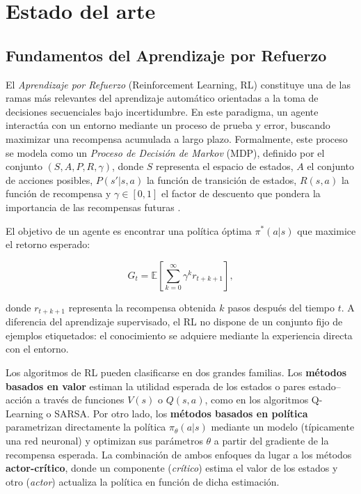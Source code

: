 \chapter{Estado del arte}

\section{Fundamentos del Aprendizaje por Refuerzo}

El \textit{Aprendizaje por Refuerzo} (Reinforcement Learning, RL) constituye una de las ramas más relevantes del aprendizaje automático orientadas a la toma de decisiones secuenciales bajo incertidumbre. En este paradigma, un agente interactúa con un entorno mediante un proceso de prueba y error, buscando maximizar una recompensa acumulada a largo plazo. Formalmente, este proceso se modela como un \textit{Proceso de Decisión de Markov} (MDP), definido por el conjunto $(S, A, P, R, \gamma)$, donde $S$ representa el espacio de estados, $A$ el conjunto de acciones posibles, $P(s'|s,a)$ la función de transición de estados, $R(s,a)$ la función de recompensa y $\gamma \in [0,1]$ el factor de descuento que pondera la importancia de las recompensas futuras \citep{SuttonBarto2018}.

El objetivo de un agente es encontrar una política óptima $\pi^*(a|s)$ que maximice el retorno esperado:

\begin{equation}
G_t = \mathbb{E}\left[\sum_{k=0}^{\infty} \gamma^k r_{t+k+1}\right],
\end{equation}

donde $r_{t+k+1}$ representa la recompensa obtenida $k$ pasos después del tiempo $t$.  
A diferencia del aprendizaje supervisado, el RL no dispone de un conjunto fijo de ejemplos etiquetados: el conocimiento se adquiere mediante la experiencia directa con el entorno.  

Los algoritmos de RL pueden clasificarse en dos grandes familias.  
Los \textbf{métodos basados en valor} estiman la utilidad esperada de los estados o pares estado–acción a través de funciones $V(s)$ o $Q(s,a)$, como en los algoritmos Q-Learning o SARSA.  
Por otro lado, los \textbf{métodos basados en política} parametrizan directamente la política $\pi_\theta(a|s)$ mediante un modelo (típicamente una red neuronal) y optimizan sus parámetros $\theta$ a partir del gradiente de la recompensa esperada.  
La combinación de ambos enfoques da lugar a los métodos \textbf{actor-crítico}, donde un componente (\textit{crítico}) estima el valor de los estados y otro (\textit{actor}) actualiza la política en función de dicha estimación.


